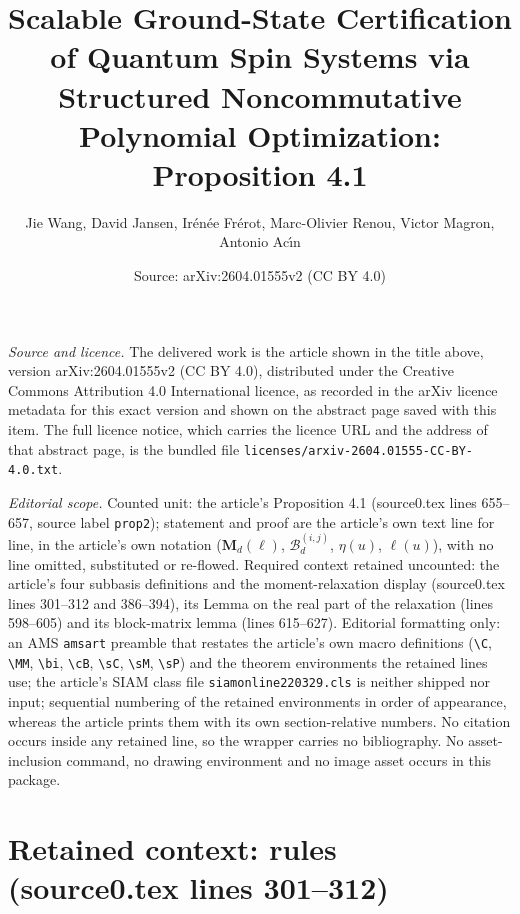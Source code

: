 \documentclass[10pt,a4paper]{amsart}
\title[Scalable Ground-State Certification of Quantum Spin Systems via Structured Noncommutative Polynomial Optimization]{Scalable Ground-State Certification of Quantum Spin Systems via Structured Noncommutative Polynomial Optimization: Proposition 4.1}
\author{Jie Wang, David Jansen, Ir\'en\'ee Fr\'erot, Marc-Olivier Renou, Victor Magron, Antonio Ac\'{\i}n}
\date{Source: arXiv:2604.01555v2 (CC BY 4.0)}
\def\MM{{\mathbf{M}}}
\def\cB{{\mathcal{B}}}
\theoremstyle{plain}
\theoremstyle{definition}
\theoremstyle{remark}
\begin{document}
\maketitle

\noindent\emph{Source and licence.} The delivered work is the article shown in the title above, version arXiv:2604.01555v2 (CC BY 4.0), distributed under the Creative Commons Attribution 4.0 International licence, as recorded in the arXiv licence metadata for this exact version and shown on the abstract page saved with this item. The full licence notice, which carries the licence URL and the address of that abstract page, is the bundled file \texttt{licenses/arxiv-2604.01555-CC-BY-4.0.txt}.\par\smallskip

\noindent\textit{Editorial scope.} Counted unit: the article's Proposition 4.1 (source0.tex lines 655--657, source label \texttt{prop2}); statement and proof are the article's own text line for line, in the article's own notation ($\MM_d(\ell)$, $\cB_d^{(i,j)}$, $\eta(u)$, $\ell(u)$), with no line omitted, substituted or re-flowed. Required context retained uncounted: the article's four subbasis definitions and the moment-relaxation display (source0.tex lines 301--312 and 386--394), its Lemma on the real part of the relaxation (lines 598--605) and its block-matrix lemma (lines 615--627). Editorial formatting only: an AMS \texttt{amsart} preamble that restates the article's own macro definitions (\texttt{\textbackslash C}, \texttt{\textbackslash MM}, \texttt{\textbackslash bi}, \texttt{\textbackslash cB}, \texttt{\textbackslash sC}, \texttt{\textbackslash sM}, \texttt{\textbackslash sP}) and the theorem environments the retained lines use; the article's SIAM class file \texttt{siamonline220329.cls} is neither shipped nor input; sequential numbering of the retained environments in order of appearance, whereas the article prints them with its own section-relative numbers. No citation occurs inside any retained line, so the wrapper carries no bibliography. No asset-inclusion command, no drawing environment and no image asset occurs in this package.


\section*{Retained context: rules (source0.tex lines 301--312)}
\end{document}
